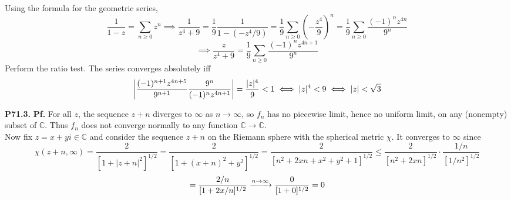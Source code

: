 \documentclass{article}
\def\mbb#1{\mathbb{#1}}
\def\tbf#1{\textbf{#1}}
\def\bC{\mbb{C}}
\newcommand{\br}[1]{\left(#1\right)}
\newcommand{\pf}{\tbf{Pf. }}
\newcommand{\imp}{\implies}
\newcommand{\sep}[1][.5cm]{\vspace{#1}}
\begin{document}
Using the formula for the geometric series,
$$\frac{1}{1-z} = \sum_{n\ge0}z^n
\imp \frac{1}{z^4+9} = \frac19 \frac{1}{1-(-z^4/9)}
= \frac19 \sum_{n\ge0}\br{-\frac{z^4}{9}}^n
= \frac19 \sum_{n\ge0}\frac{(-1)^nz^{4n}}{9^n}$$
$$\imp \boxed{\frac{z}{z^4+9} = \frac19 \sum_{n\ge0}\frac{(-1)^nz^{4n+1}}{9^n}}$$
Perform the ratio test. The series converges absolutely iff
$$\abs{\frac{(-1)^{n+1}z^{4n+5}}{9^{n+1}} \frac{9^n}{(-1)^nz^{4n+1}}} = \frac{|z|^4}{9} < 1
\iff |z|^4 < 9
\iff |z| < \sqrt3$$
\sep



\tbf{P71.3.} \pf For all $z$, the sequence $z+n$ diverges to $\infty$ as $n\to\infty$, so $f_n$ has no piecewise limit, hence no uniform limit, on any (nonempty) subset of $\bC$. Thus $f_n$ does not converge normally to any function $\bC\to\bC$.\\

Now fix $z=x+yi\in\bC$ and consider the sequence $z+n$ on the Riemann sphere with the spherical metric $\chi$. It converges to $\infty$ since
$$\chi(z+n,\infty) = \frac{2}{[1+|z+n|^2]^{1/2}}
= \frac{2}{[1+(x+n)^2+y^2]^{1/2}}
= \frac{2}{[n^2+2xn+x^2+y^2+1]^{1/2}}
\le \frac{2}{[n^2+2xn]^{1/2}} \cdot \frac{1/n}{[1/n^2]^{1/2}}$$
$$= \frac{2/n}{[1+2x/n]^{1/2}}
\app[n][\infty]
\frac{0}{[1+0]^{1/2}}
= 0$$
\end{document}
